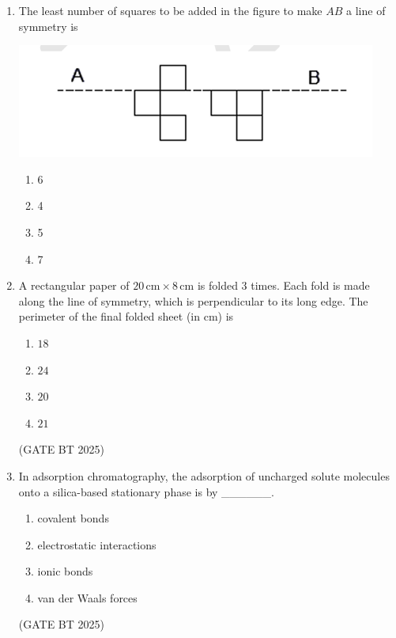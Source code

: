 \documentclass[journal,12pt,onecolumn]{IEEEtran}
\theoremstyle{remark}
\begin{document}
\begin{enumerate}
\item The least number of squares to be added in the figure to make $AB$ a line of symmetry is

\begin{center}
\includegraphics[width=\columnwidth]{figs/figure_path.png}
\label{fig:figure_path}
\end{center}

\begin{enumerate}
    \item 6
    \item 4
    \item 5
    \item 7
\end{enumerate}

\item 
A rectangular paper of $20\,\text{cm} \times 8\,\text{cm}$ is folded $3$ times. Each fold is made along the line of symmetry, which is perpendicular to its long edge. The perimeter of the final folded sheet (in cm) is

\begin{enumerate}
    \item $18$
    \item $24$
    \item $20$
    \item $21$
\end{enumerate}
\hfill(GATE BT 2025)

\item 
In adsorption chromatography, the adsorption of uncharged solute molecules onto a silica-based stationary phase is by \_\_\_\_\_\_.

\begin{enumerate}
    \item covalent bonds
    \item electrostatic interactions
    \item ionic bonds
    \item van der Waals forces
\end{enumerate}
\hfill(GATE BT 2025)


\end{enumerate}
\end{document}
